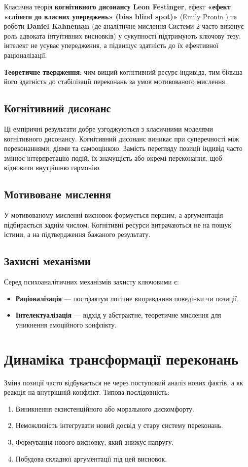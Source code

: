 \documentclass[12pt,a4paper]{article}
\begin{document}
Класична теорія \textbf{когнітивного дисонансу Leon Festinger}, ефект \textbf{«ефект «сліпоти до власних упереджень» (bias blind spot)»} (Emily Pronin \cite{pronin2007}) та роботи \textbf{Daniel Kahneman \cite{kahneman2011}} (де аналітичне мислення Системи 2 часто виконує роль адвоката інтуїтивних висновків) у сукупності підтримують ключову тезу: інтелект не усуває упередження, а підвищує здатність до їх ефективної раціоналізації.

\textbf{Теоретичне твердження}: чим вищий когнітивний ресурс індивіда, тим більша його здатність до стабілізації переконань за умов мотивованого мислення.

\subsection{Когнітивний дисонанс}
Ці емпіричні результати добре узгоджуються з класичними моделями когнітивного дисонансу. Когнітивний дисонанс виникає при суперечності між переконаннями, діями та самооцінкою. Замість перегляду позиції індивід часто змінює інтерпретацію подій, їх значущість або окремі переконання, щоб відновити внутрішню гармонію.

\subsection{Мотивоване мислення}
У мотивованому мисленні висновок формується першим, а аргументація підбирається заднім числом. Когнітивні ресурси витрачаються не на пошук істини, а на підтвердження бажаного результату.

\subsection{Захисні механізми}
Серед психоаналітичних механізмів захисту ключовими є:
\begin{itemize}
    \item \textbf{Раціоналізація} — постфактум логічне виправдання поведінки чи позиції.
    \item \textbf{Інтелектуалізація} — відхід у абстрактне, теоретичне мислення для уникнення емоційного конфлікту.
\end{itemize}

\section{Динаміка трансформації переконань}
Зміна позиції часто відбувається не через поступовий аналіз нових фактів, а як реакція на внутрішній конфлікт. Типова послідовність:
\begin{enumerate}[label=\arabic*.]
    \item Виникнення екзистенційного або морального дискомфорту.
    \item Неможливість інтегрувати новий досвід у стару систему переконань.
    \item Формування нового висновку, який знижує напругу.
    \item Побудова складної аргументації під цей висновок.
\end{enumerate}
\end{document}
